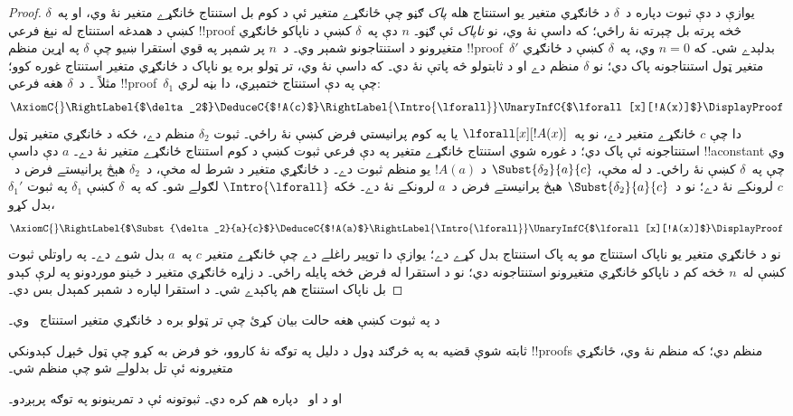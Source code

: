 \documentclass[../../../include/open-logic-section]{subfiles}
\begin{document}
\begin{proof}
يوازې د دې ثبوت دپاره د~$\delta$ د ځانګړي متغير يو استنتاج هله
\emph{پاک} ګڼو چې ځانګړے متغير ئې د کوم بل استنتاج ځانګړے
متغير نۀ وي، او په~$\delta$ کښې د همدغه استنتاج له نېغ فرعي
!!{proof} څخه پرته بل چېرته نۀ راځي؛ که داسې نۀ وي، نو
\emph{ناپاک} ئې ګڼو۔ $n$ دې په~$\delta$ کښې د ناپاکو ځانګړي
متغيرونو د استنتاجونو شمېر وي۔ د~$n$ پر شمېر په قوي استقرا
ښيو چې $\delta$ په اړين منظم !!{proof}~$\delta'$ بدلېدے شي۔ که
$n=0$ وي، په~$\delta$ کښې د ځانګړي متغير ټول استنتاجونه پاک
دي؛ نو $\delta$ منظم دے او د ثابتولو څه پاتې نۀ دي۔ که داسې
نۀ وي، تر ټولو بره يو ناپاک د ځانګړي متغير استنتاج غوره کوو؛
مثلاً \Intro{\lforall}۔ د~$\delta$ هغه فرعي !!{proof}~$\delta_1$
چې په دې استنتاج ختمېږي، دا بڼه لري:
\[
    \AxiomC{}
    \RightLabel{$\delta_2$}
    \DeduceC{$!A(c)$}
    \RightLabel{\Intro{\lforall}}
    \UnaryInfC{$\lforall[x][!A(x)]$}
    \DisplayProof
    \]
دا چې $c$ ځانګړے متغير دے، نو په~$\lforall[x][!A(x)]$ يا په کوم
پرانيستي فرض کښې نۀ راځي۔ ثبوت $\delta_2$ منظم دے، ځکه د
ځانګړي متغير ټول استنتاجونه ئې پاک دي؛ د غوره شوي استنتاج
ځانګړے متغير په دې فرعي ثبوت کښې د کوم استنتاج ځانګړے
متغير نۀ دے۔ $a$ دې داسې !!a{constant} وي چې په~$\delta$
کښې نۀ راځي۔ د  له مخې، $\Subst{\delta_2}{a}{c}$
د $!A(a)$ يو منظم ثبوت دے۔ د ځانګړي متغير د شرط له مخې،
د~$\delta_2$ هېڅ پرانيستے فرض د~$c$ لرونکے نۀ دے؛ نو
د~$\Subst{\delta_2}{a}{c}$ هېڅ پرانيستے فرض د~$a$ لرونکے نۀ دے۔ ځکه
$\Intro{\lforall}$ لګولے شو۔ که په~$\delta$ کښې $\delta_1$ په ثبوت $\delta_1'$
بدل کړو،
\[
    \AxiomC{}
    \RightLabel{$\Subst{\delta_2}{a}{c}$}
    \DeduceC{$!A(a)$}
    \RightLabel{\Intro{\lforall}}
    \UnaryInfC{$\lforall[x][!A(x)]$}
    \DisplayProof
    \]
نو د ځانګړي متغير يو ناپاک استنتاج مو په پاک استنتاج بدل کړے
دے؛ يوازې دا توپير راغلے دے چې ځانګړے متغير $c$ په~$a$
بدل شوے دے۔ په راوتلي ثبوت کښې له~$n$ څخه کم د ناپاکو
ځانګړي متغيرونو استنتاجونه دي؛ نو د استقرا له فرض څخه پايله راځي۔
د زاړه ځانګړي متغير د ځينو موردونو په لرې کېدو بل
ناپاک استنتاج هم پاکېدے شي۔ د استقرا لپاره د شمېر کمېدل بس دي۔
\end{proof}

\begin{prob}
د  په ثبوت کښې هغه حالت بيان کړئ چې
تر ټولو بره د ځانګړي متغير استنتاج~\Elim{\lexists} وي۔
\end{prob}

ثابته شوې قضيه به په څرګند ډول د دليل په توګه نۀ کاروو،
خو فرض به کړو چې ټول څېړل کېدونکي !!{proof}s منظم دي؛
که منظم نۀ وي، ځانګړي متغيرونه ئې تل بدلولے شو چې منظم شي۔

 او  د
 او~ دپاره هم کره دي۔ ثبوتونه ئې
د تمرينونو په توګه پرېږدو۔
\end{document}
